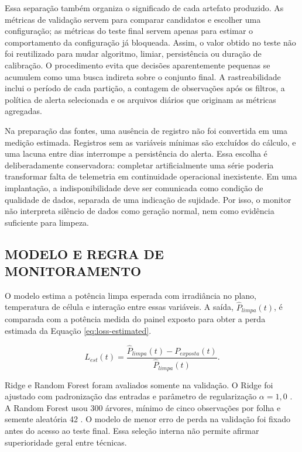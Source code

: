 \documentclass{UNESC}
\begin{document}
Essa separação também organiza o significado de cada artefato produzido. As métricas de validação servem para comparar candidatos e escolher uma configuração; as métricas do teste final servem apenas para estimar o comportamento da configuração já bloqueada. Assim, o valor obtido no teste não foi reutilizado para mudar algoritmo, limiar, persistência ou duração de calibração. O procedimento evita que decisões aparentemente pequenas se acumulem como uma busca indireta sobre o conjunto final. A rastreabilidade inclui o período de cada partição, a contagem de observações após os filtros, a política de alerta selecionada e os arquivos diários que originam as métricas agregadas.

Na preparação das fontes, uma ausência de registro não foi convertida em uma medição estimada. Registros sem as variáveis mínimas são excluídos do cálculo, e uma lacuna entre dias interrompe a persistência do alerta. Essa escolha é deliberadamente conservadora: completar artificialmente uma série poderia transformar falta de telemetria em continuidade operacional inexistente. Em uma implantação, a indisponibilidade deve ser comunicada como condição de qualidade de dados, separada de uma indicação de sujidade. Por isso, o monitor não interpreta silêncio de dados como geração normal, nem como evidência suficiente para limpeza.

\subsection{MODELO E REGRA DE MONITORAMENTO}

O modelo estima a potência limpa esperada com irradiância no plano, temperatura de célula e interação entre essas variáveis. A saída, $\widehat{P}_{limpa}(t)$, é comparada com a potência medida do painel exposto para obter a perda estimada da Equação \ref{eq:loss-estimated}.

\begin{equation}
L_{est}(t)=\frac{\widehat{P}_{limpa}(t)-P_{exposta}(t)}{\widehat{P}_{limpa}(t)}.
\label{eq:loss-estimated}
\end{equation}

Ridge e Random Forest foram avaliados somente na validação. O Ridge foi ajustado com padronização das entradas e parâmetro de regularização $\alpha=1{,}0$ \cite{hoerl1970}. A Random Forest usou 300 árvores, mínimo de cinco observações por folha e semente aleatória 42 \cite{breiman2001}. O modelo de menor erro de perda na validação foi fixado antes do acesso ao teste final. Essa seleção interna não permite afirmar superioridade geral entre técnicas.
\end{document}
